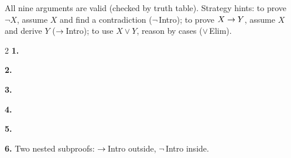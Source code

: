 \begin{nbsolution}
All nine arguments are valid (checked by truth table). Strategy hints: to prove $\neg X$,
assume $X$ and find a contradiction ($\neg$\,Intro); to prove $X \rightarrow Y$, assume $X$ and
derive $Y$ ($\rightarrow$\,Intro); to use $X \lor Y$, reason by cases ($\lor$\,Elim).
\begin{multicols}{2}
\textbf{1.}
\begin{fitchproof}
 \RPrem
{} \RPrem
\open
{} \RAss
{} 
 
\close
{} 
\end{fitchproof}
\textbf{2.}
\begin{fitchproof}
 \RPrem
{} \RPrem
\open
{} \RAss
{} 
 
 
 
\close
{} 
\end{fitchproof}
\textbf{3.}
\begin{fitchproof}
 \RPrem
{} \RPrem
\open
{} \RAss
{} 
 
 
\close
{} 
\end{fitchproof}
\columnbreak
\textbf{4.}
\begin{fitchproof}
 \RPrem
{} \RPrem
\open
{} \RAss
{} 
 
 
 
 
 
\close
{} 
\end{fitchproof}
\textbf{5.}
\begin{fitchproof}
 \RPrem
{} \RPrem
{} \RPrem
\open
{} \RAss
{} 
 
 
 
 
 
\close
{} 
\end{fitchproof}
\end{multicols}
\textbf{6.} Two nested subproofs: $\rightarrow$\,Intro outside, $\neg$\,Intro inside.
\begin{fitchproof}
 \RPrem
{} \RPrem

\end{fitchproof}
\end{nbsolution}

